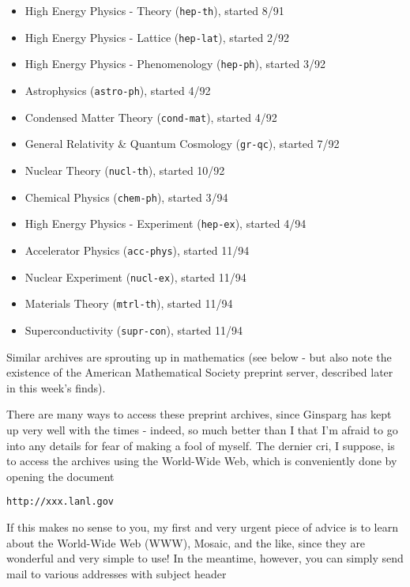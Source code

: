 \documentclass{article}
\def\tightlist{}
\begin{document}
\begin{itemize}
\tightlist
\item
  High Energy Physics - Theory (\texttt{hep-th}), started 8/91
\item
  High Energy Physics - Lattice (\texttt{hep-lat}), started 2/92
\item
  High Energy Physics - Phenomenology (\texttt{hep-ph}), started 3/92
\item
  Astrophysics (\texttt{astro-ph}), started 4/92
\item
  Condensed Matter Theory (\texttt{cond-mat}), started 4/92
\item
  General Relativity \& Quantum Cosmology (\texttt{gr-qc}), started 7/92
\item
  Nuclear Theory (\texttt{nucl-th}), started 10/92
\item
  Chemical Physics (\texttt{chem-ph}), started 3/94
\item
  High Energy Physics - Experiment (\texttt{hep-ex}), started 4/94
\item
  Accelerator Physics (\texttt{acc-phys}), started 11/94
\item
  Nuclear Experiment (\texttt{nucl-ex}), started 11/94
\item
  Materials Theory (\texttt{mtrl-th}), started 11/94
\item
  Superconductivity (\texttt{supr-con}), started 11/94
\end{itemize}

Similar archives are sprouting up in mathematics (see below - but also
note the existence of the American Mathematical Society preprint server,
described later in this week's finds).

There are many ways to access these preprint archives, since Ginsparg
has kept up very well with the times - indeed, so much better than I
that I'm afraid to go into any details for fear of making a fool of
myself. The dernier cri, I suppose, is to access the archives using the
World-Wide Web, which is conveniently done by opening the document

\begin{verbatim}
http://xxx.lanl.gov
\end{verbatim}

If this makes no sense to you, my first and very urgent piece of advice
is to learn about the World-Wide Web (WWW), Mosaic, and the like, since
they are wonderful and very simple to use! In the meantime, however, you
can simply send mail to various addresses with subject header
\end{document}

